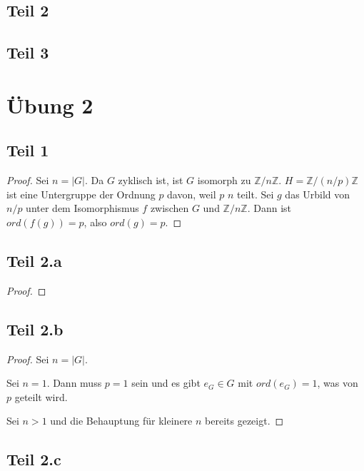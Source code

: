 \documentclass[10pt,a4paper]{article}
\begin{document}
\subsection{Teil 2}

\subsection{Teil 3}

\section{Übung 2}

\subsection{Teil 1}

\begin{proof}
  Sei $n = |G|$.
  Da $G$ zyklisch ist, ist $G$ isomorph zu $\mathbb{Z} / n \mathbb{Z}$.
  $H = \mathbb{Z} / (n / p) \mathbb{Z}$ ist eine Untergruppe der Ordnung $p$ davon, weil $p$ $n$ teilt.
  Sei $g$ das Urbild von $n / p$ unter dem Isomorphismus $f$ zwischen $G$ und $\mathbb{Z} / n \mathbb{Z}$.
  Dann ist $ord(f(g)) = p$, also $ord(g) = p$.
\end{proof}

\subsection{Teil 2.a}

\begin{proof}

\end{proof}

\subsection{Teil 2.b}

\begin{proof}
  Sei $n = |G|$.

  Sei $n = 1$.
  Dann muss $p = 1$ sein und es gibt $e_{G} \in G$ mit $ord(e_{G}) = 1$, was von $p$ geteilt wird.

  Sei $n > 1$ und die Behauptung für kleinere $n$ bereits gezeigt.
\end{proof}

\subsection{Teil 2.c}
\end{document}
